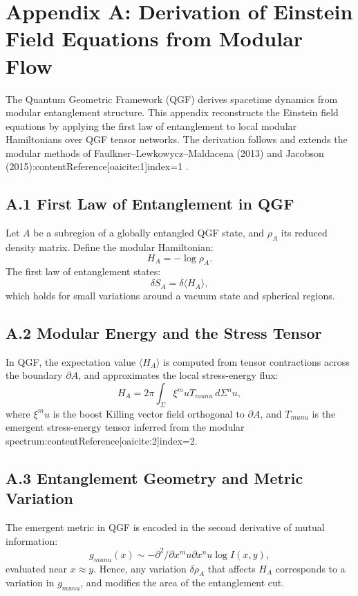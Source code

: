 \documentclass[11pt]{article}
\def\mu{mu}
\def\nu{nu}
\def\frac#1#2{#1/#2}
\begin{document}
\section*{Appendix A: Derivation of Einstein Field Equations from Modular Flow}

The Quantum Geometric Framework (QGF) derives spacetime dynamics from modular entanglement structure. This appendix reconstructs the Einstein field equations by applying the first law of entanglement to local modular Hamiltonians over QGF tensor networks. The derivation follows and extends the modular methods of Faulkner–Lewkowycz–Maldacena (2013) and Jacobson (2015):contentReference[oaicite:1]{index=1} .

\subsection*{A.1 First Law of Entanglement in QGF}

Let \( A \) be a subregion of a globally entangled QGF state, and \( \rho_A \) its reduced density matrix. Define the modular Hamiltonian:
\[
H_A = -\log \rho_A.
\]
The first law of entanglement states:
\[
\delta S_A = \delta \langle H_A \rangle,
\]
which holds for small variations around a vacuum state and spherical regions.

\subsection*{A.2 Modular Energy and the Stress Tensor}

In QGF, the expectation value \( \langle H_A \rangle \) is computed from tensor contractions across the boundary \( \partial A \), and approximates the local stress-energy flux:
\[
H_A = 2\pi \int_\Sigma \xi^\mu T_{\mu\nu} \, d\Sigma^\nu,
\]
where \( \xi^\mu \) is the boost Killing vector field orthogonal to \( \partial A \), and \( T_{\mu\nu} \) is the emergent stress-energy tensor inferred from the modular spectrum:contentReference[oaicite:2]{index=2}.

\subsection*{A.3 Entanglement Geometry and Metric Variation}

The emergent metric in QGF is encoded in the second derivative of mutual information:
\[
g_{\mu\nu}(x) \sim -\frac{\partial^2}{\partial x^\mu \partial x^\nu} \log I(x,y),
\]
evaluated near \( x \approx y \). Hence, any variation \( \delta \rho_A \) that affects \( H_A \) corresponds to a variation in \( g_{\mu\nu} \), and modifies the area of the entanglement cut.
\end{document}
